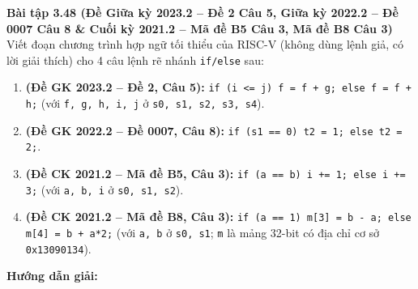 \textbf{Bài tập 3.48 (Đề Giữa kỳ 2023.2 -- Đề 2 Câu 5, Giữa kỳ 2022.2 -- Đề 0007 Câu 8 \& Cuối kỳ 2021.2 -- Mã đề B5 Câu 3, Mã đề B8 Câu 3)}\\
Viết đoạn chương trình hợp ngữ tối thiểu của RISC-V (không dùng lệnh giả, có lời giải thích) cho 4 câu lệnh rẽ nhánh \texttt{if/else} sau:
\begin{enumerate}[label=\alph*)]
    \item \textbf{(Đề GK 2023.2 -- Đề 2, Câu 5):} \texttt{if (i <= j) f = f + g; else f = f + h;} (với \texttt{f, g, h, i, j} ở \texttt{s0, s1, s2, s3, s4}).
    \item \textbf{(Đề GK 2022.2 -- Đề 0007, Câu 8):} \texttt{if (s1 == 0) t2 = 1; else t2 = 2;}.
    \item \textbf{(Đề CK 2021.2 -- Mã đề B5, Câu 3):} \texttt{if (a == b) i += 1; else i += 3;} (với \texttt{a, b, i} ở \texttt{s0, s1, s2}).
    \item \textbf{(Đề CK 2021.2 -- Mã đề B8, Câu 3):} \texttt{if (a == 1) m[3] = b - a; else m[4] = b + a*2;} (với \texttt{a, b} ở \texttt{s0, s1}; \texttt{m} là mảng 32-bit có địa chỉ cơ sở \texttt{0x13090134}).
\end{enumerate}
\textbf{Hướng dẫn giải:}
